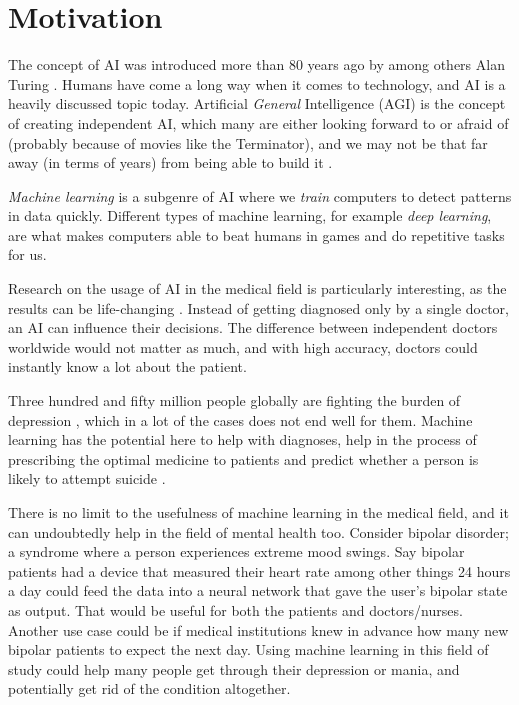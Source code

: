 \section{Motivation}

The concept of AI was introduced more than 80 years ago by among others Alan Turing \cite{turing1938}. Humans have come a long way when it comes to technology, and AI is a heavily discussed topic today. Artificial \textit{General} Intelligence (AGI) is the concept of creating independent AI, which many are either looking forward to or afraid of (probably because of movies like the Terminator), and we may not be that far away (in terms of years) from being able to build it \cite{peter_morgan_2019}. 

\textit{Machine learning} is a subgenre of AI where we \textit{train} computers to detect patterns in data quickly. Different types of machine learning, for example \textit{deep learning}, are what makes computers able to beat humans in games and do repetitive tasks for us. 

Research on the usage of AI in the medical field is particularly interesting, as the results can be life-changing \cite{topol2019}. Instead of getting diagnosed only by a single doctor, an AI can influence their decisions. The difference between independent doctors worldwide would not matter as much, and with high accuracy, doctors could instantly know a lot about the patient. 

Three hundred and fifty million people globally are fighting the burden of depression \cite{burden_of_depression}, which in a lot of the cases does not end well for them. Machine learning has the potential here to help with diagnoses, help in the process of prescribing the optimal medicine to patients and predict whether a person is likely to attempt suicide \cite{topol2019}. 

There is no limit to the usefulness of machine learning in the medical field, and it can undoubtedly help in the field of mental health too. Consider bipolar disorder; a syndrome where a person experiences extreme mood swings. Say bipolar patients had a device that measured their heart rate among other things 24 hours a day could feed the data into a neural network that gave the user's bipolar state as output. That would be useful for both the patients and doctors/nurses. Another use case could be if medical institutions knew in advance how many new bipolar patients to expect the next day. Using machine learning in this field of study could help many people get through their depression or mania, and potentially get rid of the condition altogether.

